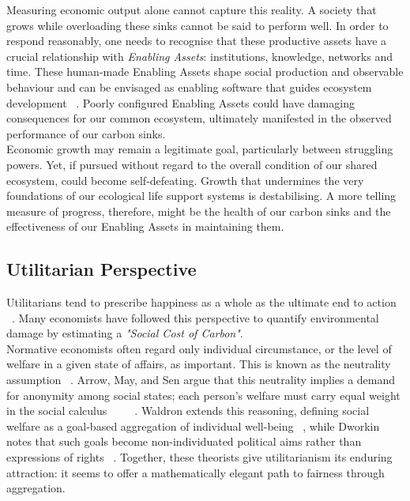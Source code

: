 \documentclass[10pt, oneside]{article}   	%
\begin{document}
Measuring economic output alone cannot capture this reality.
A society that grows while overloading these sinks cannot be said to perform well.
In order to respond reasonably, one needs to recognise that these productive assets have a crucial relationship with \emph{Enabling Assets}: institutions, knowledge, networks and time.
These human-made Enabling Assets shape social production and observable behaviour and can be envisaged as enabling software that guides ecosystem development ~\cite{pd3}.
Poorly configured Enabling Assets could have damaging consequences for our common ecosystem, ultimately manifested in the observed performance of our carbon sinks.\\

Economic growth may remain a legitimate goal, particularly between struggling powers.
Yet, if pursued without regard to the overall condition of our shared ecosystem, could become self-defeating.
Growth that undermines the very foundations of our ecological life support systems is destabilising.
A more telling measure of progress, therefore, might be the health of our carbon sinks and the effectiveness of our Enabling Assets in maintaining them.\\

\subsection{Utilitarian Perspective}

Utilitarians tend to prescribe happiness as a whole as the ultimate end to action ~\cite{hs1}.
Many economists have followed this perspective to quantify environmental damage by estimating a \emph{"Social Cost of Carbon"}.\\

Normative economists often regard only individual circumstance, or the level of welfare in a given state of affairs, as important.
This is known as the neutrality assumption ~\cite{pd2}.
Arrow, May, and Sen argue that this neutrality implies a demand for anonymity among social states; each person’s welfare must carry equal weight in the social calculus ~\cite{ka1} ~\cite{km1} ~\cite{as2}.
Waldron extends this reasoning, defining social welfare as a goal-based aggregation of individual well-being ~\cite{jw2}, while Dworkin notes that such goals become non-individuated political aims rather than expressions of rights ~\cite{rd1}.
Together, these theorists give utilitarianism its enduring attraction: it seems to offer a mathematically elegant path to fairness through aggregation.\\
\end{document}
